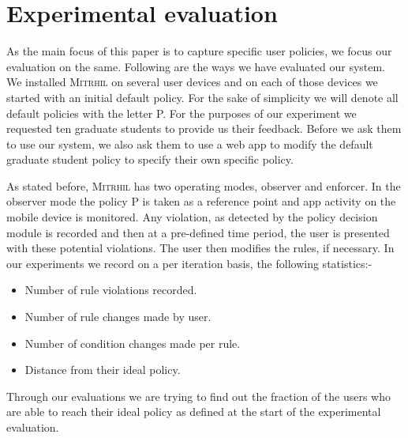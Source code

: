 \section{Experimental evaluation}
\label{eval}
As the main focus of this paper is to capture specific user policies, we focus our evaluation on the same. Following are the ways we have evaluated our system. We installed \textsc{Mitrhil} on several user devices and on each of those devices we started with an initial default policy. For the sake of simplicity we will denote all default policies with the letter P. For the purposes of our experiment we requested ten graduate students to provide us their feedback. Before we ask them to use our system, we also ask them to use a web app to modify the default graduate student policy to specify their own specific policy. 

As stated before, \textsc{Mitrhil} has two operating modes, observer and enforcer. In the observer mode the policy P is taken as a reference point and app activity on the mobile device is monitored. Any violation, as detected by the policy decision module is recorded and then at a pre-defined time period, the user is presented with these potential violations. The user then modifies the rules, if necessary. In our experiments we record on a per iteration basis, the following statistics:-
\begin{itemize}
	\item Number of rule violations recorded.
	\item Number of rule changes made by user.
	\item Number of condition changes made per rule.
	\item Distance from their ideal policy.
\end{itemize}

Through our evaluations we are trying to find out the fraction of the users who are able to reach their ideal policy as defined at the start of the experimental evaluation. 




